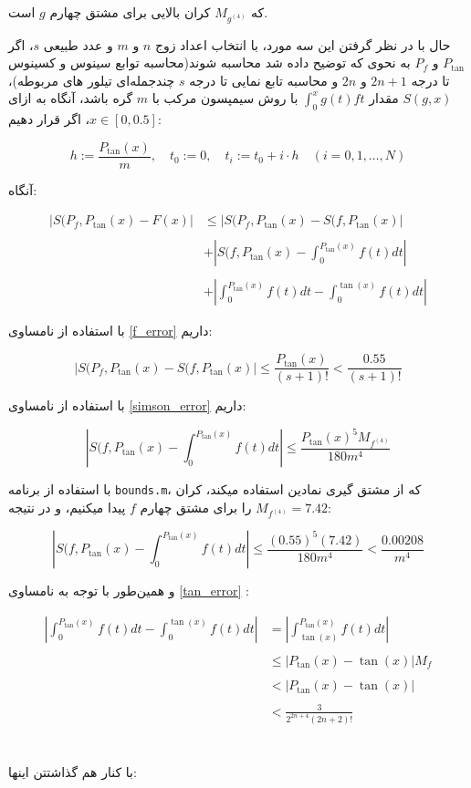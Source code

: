 \documentclass[12pt,a4paper]{article}
\begin{document}
که $M_{g^{(4)}}$ کران بالایی برای مشتق چهارم $g$ است. 

\newpage
حال با در نظر گرفتن این سه مورد، با انتخاب اعداد زوج $n$ و $m$ و عدد طبیعی $s$، اگر $P_{\tan}$ و $P_f$ به نحوی که توضیح داده شد محاسبه شوند(محاسبه توابع سینوس و کسینوس تا درجه $2n+1$ و $2n$ و محاسبه تابع نمایی تا درجه $s$ چند‌جمله‌ای تیلور های مربوطه)، $S(g,x)$ مقدار $\int_0^xg(t)ft$ با روش سیمپسون مرکب با $m$ گره باشد، آنگاه به ازای $x \in [0,0.5]$، اگر قرار دهیم:

\begin{equation*}
h := \frac{P_{\tan}(x)}{m}, \quad t_0 := 0, \quad t_i := t_0 + i \cdot h \quad (i = 0, 1, \dots, N)
\end{equation*}

آنگاه:

\begin{align*}
    \left| S(P_f,P_{\tan}(x) - F(x) \right| &\le \left| S(P_f,P_{\tan}(x) - S(f,P_{\tan}(x) \right| \\\\&+
    \left| S(f,P_{\tan}(x) - \int_0^{P_{\tan}(x)}f(t)dt \right| \\\\&+
    \left| \int_0^{P_{\tan}(x)}f(t)dt - \int_0^{\tan(x)}f(t)dt \right|
\end{align*}

با استفاده از نامساوی \ref{f_error} داریم:

\begin{equation*}
    |S(P_f,P_{\tan}(x) - S(f,P_{\tan}(x)| \le \frac{P_{\tan}(x)}{(s+1)!} < \frac{0.55}{(s+1)!}
\end{equation*}

با استفاده از نامساوی \ref{simson_error} داریم: 

\begin{equation*}
    |S(f,P_{\tan}(x) - \int_0^{P_{\tan}(x)}f(t)dt| \le \frac{P_{\tan}(x)^5 M_{f^{(4)}}}{180m^4}
\end{equation*}

با استفاده از برنامه \texttt{bounds.m}، که از مشتق گیری نمادین استفاده میکند، کران $M_{f^{(4)}} = 7.42$ را برای مشتق چهارم $f$ پیدا میکنیم، و در نتیجه:

\begin{equation*}
    |S(f,P_{\tan}(x) - \int_0^{P_{\tan}(x)}f(t)dt| \le \frac{(0.55)^5 (7.42)}{180m^4} < \frac{0.00208}{m^4}
\end{equation*}

و همین‌طور با توجه به نامساوی \ref{tan_error} :

\begin{align*}
    \left| \int_0^{P_{\tan}(x)}f(t)dt - \int_0^{\tan(x)}f(t)dt \right| &= \left| \int_{\tan(x)}^{P_{\tan}(x)}f(t)dt \right| \\\\ &\le
    |P_{\tan}(x) - \tan(x)|M_{f} \\\\ &<
    |P_{\tan}(x) - \tan(x)| \\\\ &<
    \frac{3}{2^{2n+4}(2n+2)!}
\end{align*}
\\\\
با کنار هم گذاشتتن اینها: 
\end{document}
